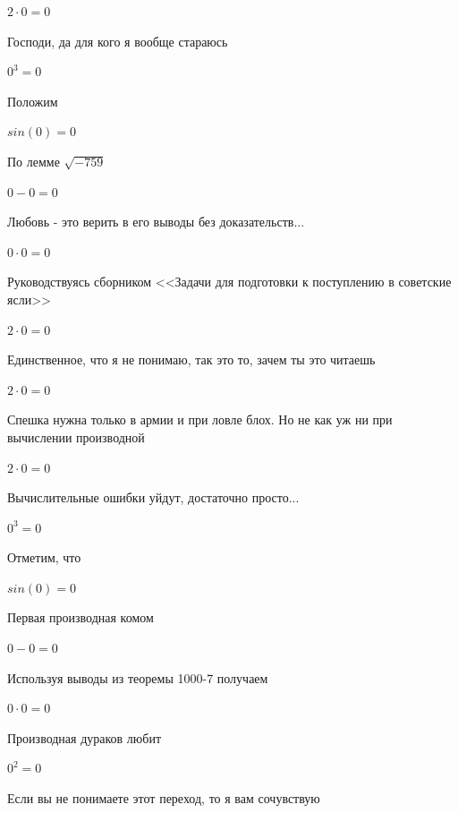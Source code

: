 \documentclass[12pt,a4paper,fleqn]{article}
\begin{document}
\begin{center}$2 \cdot 0 = 0$\end{center}
Господи, да для кого я вообще стараюсь

\begin{center}$0^{3} = 0$\end{center}
Положим

\begin{center}$sin(0) = 0$\end{center}
По лемме $\sqrt{-759}$
\begin{center}$0-0 = 0$\end{center}
Любовь - это верить в его выводы без доказательств...

\begin{center}$0 \cdot 0 = 0$\end{center}
Руководствуясь сборником <<Задачи для подготовки к поступлению в советские ясли>>\cite{link1}

\begin{center}$2 \cdot 0 = 0$\end{center}
Единственное, что я не понимаю, так это то, зачем ты это читаешь

\begin{center}$2 \cdot 0 = 0$\end{center}
Спешка нужна только в армии и при ловле блох. Но не как уж ни при вычислении производной\cite{link2}

\begin{center}$2 \cdot 0 = 0$\end{center}
Вычислительные ошибки уйдут, достаточно просто...

\begin{center}$0^{3} = 0$\end{center}
Отметим, что

\begin{center}$sin(0) = 0$\end{center}
Первая производная комом\cite{link2}

\begin{center}$0-0 = 0$\end{center}
Используя выводы из теоремы 1000-7 получаем

\begin{center}$0 \cdot 0 = 0$\end{center}
Производная дураков любит\cite{link2}

\begin{center}$0^{2} = 0$\end{center}
Если вы не понимаете этот переход, то я вам сочувствую
\end{document}
